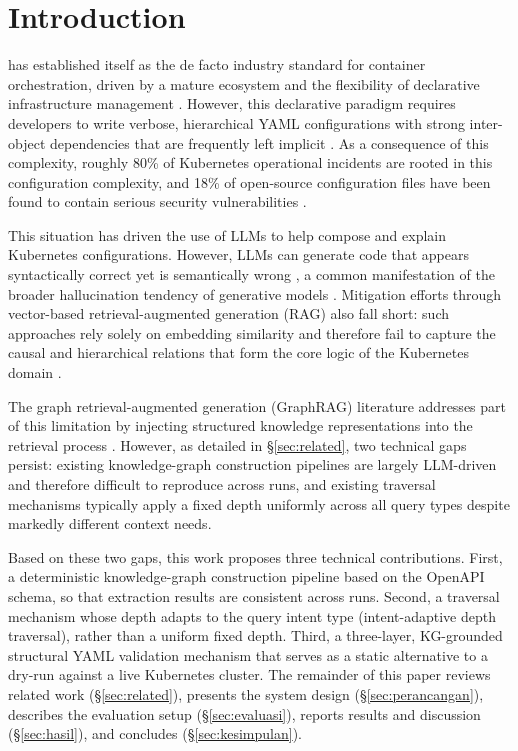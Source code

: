 \documentclass{ieeeaccess}
\begin{document}
\titlepgskip=-15pt

\maketitle

\section{Introduction}
\label{sec:pendahuluan}

 \cite{k8s_docs_concepts} has established itself as the de facto industry standard for container orchestration, driven by a mature ecosystem and the flexibility of declarative infrastructure management \cite{cncf_2023_survey,gartner_cloud_2021}. However, this declarative paradigm requires developers to write verbose, hierarchical YAML configurations with strong inter-object dependencies that are frequently left implicit \cite{soldani_pains_2018}. As a consequence of this complexity, roughly 80\% of Kubernetes operational incidents are rooted in this configuration complexity, and 18\% of open-source configuration files have been found to contain serious security vulnerabilities \cite{rahman2023misconfigurations}.

This situation has driven the use of LLMs to help compose and explain Kubernetes configurations. However, LLMs can generate code that appears syntactically correct yet is semantically wrong \cite{liu2024deepanalysis}, a common manifestation of the broader hallucination tendency of generative models \cite{ji_hallucination_2023}. Mitigation efforts through vector-based retrieval-augmented generation (RAG) also fall short: such approaches rely solely on embedding similarity and therefore fail to capture the causal and hierarchical relations that form the core logic of the Kubernetes domain \cite{wan2025empowering}.

The graph retrieval-augmented generation (GraphRAG) literature addresses part of this limitation by injecting structured knowledge representations into the retrieval process \cite{han_graphrag_2024}. However, as detailed in \S\ref{sec:related}, two technical gaps persist: existing knowledge-graph construction pipelines are largely LLM-driven and therefore difficult to reproduce across runs, and existing traversal mechanisms typically apply a fixed depth uniformly across all query types despite markedly different context needs.

Based on these two gaps, this work proposes three technical contributions. First, a deterministic knowledge-graph construction pipeline based on the OpenAPI schema, so that extraction results are consistent across runs. Second, a traversal mechanism whose depth adapts to the query intent type (intent-adaptive depth traversal), rather than a uniform fixed depth. Third, a three-layer, KG-grounded structural YAML validation mechanism that serves as a static alternative to a dry-run against a live Kubernetes cluster. The remainder of this paper reviews related work (\S\ref{sec:related}), presents the system design (\S\ref{sec:perancangan}), describes the evaluation setup (\S\ref{sec:evaluasi}), reports results and discussion (\S\ref{sec:hasil}), and concludes (\S\ref{sec:kesimpulan}).
\end{document}
